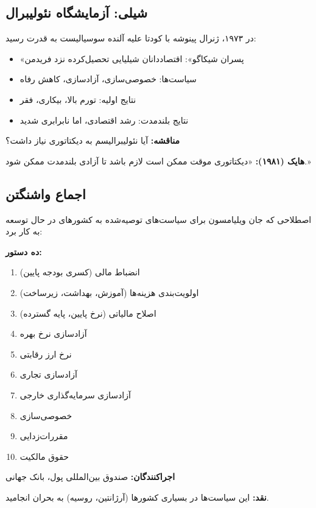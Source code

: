 \subsection{شیلی: آزمایشگاه نئولیبرال}

\begin{historybox}
در ۱۹۷۳، ژنرال پینوشه با کودتا علیه آلنده سوسیالیست به قدرت رسید:
\begin{itemize}[nosep]
    \item «پسران شیکاگو»: اقتصاددانان شیلیایی تحصیل‌کرده نزد فریدمن
    \item سیاست‌ها: خصوصی‌سازی، آزادسازی، کاهش رفاه
    \item نتایج اولیه: تورم بالا، بیکاری، فقر
    \item نتایج بلندمدت: رشد اقتصادی، اما نابرابری شدید
\end{itemize}

\textbf{مناقشه:} آیا نئولیبرالیسم به دیکتاتوری نیاز داشت؟

\textbf{هایک (۱۹۸۱):} «دیکتاتوری موقت ممکن است لازم باشد تا آزادی بلندمدت ممکن شود.»
\end{historybox}

\subsection{اجماع واشنگتن}

\begin{defbox}
اصطلاحی که جان ویلیامسون برای سیاست‌های توصیه‌شده به کشورهای در حال توسعه به کار برد:

\textbf{ده دستور:}
\begin{enumerate}[nosep]
    \item انضباط مالی (کسری بودجه پایین)
    \item اولویت‌بندی هزینه‌ها (آموزش، بهداشت، زیرساخت)
    \item اصلاح مالیاتی (نرخ پایین، پایه گسترده)
    \item آزادسازی نرخ بهره
    \item نرخ ارز رقابتی
    \item آزادسازی تجاری
    \item آزادسازی سرمایه‌گذاری خارجی
    \item خصوصی‌سازی
    \item مقررات‌زدایی
    \item حقوق مالکیت
\end{enumerate}

\textbf{اجراکنندگان:} صندوق بین‌المللی پول، بانک جهانی

\textbf{نقد:} این سیاست‌ها در بسیاری کشورها (آرژانتین، روسیه) به بحران انجامید.
\end{defbox}


